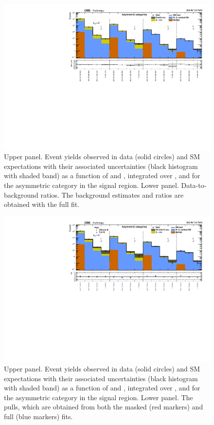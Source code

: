 \clearpage
\begin{figure}[h!]
  \centering
  \caption{Upper panel. Event yields observed in data (solid circles)
    and SM expectations with their associated uncertainties (black
    histogram with shaded band) as a function of \nb and \scalht,
    integrated over \mht, and for the asymmetric \njet category
    in the signal region. Lower panel. Data-to-background ratios. The
    background estimates and ratios are obtained with the full fit. }
  \label{fig:mr_asym_post}
  \includegraphics[width=1.\linewidth]{figures/results/36invfb_preapproval/asym/summaryPlot_Asymmetric_fit_b}
\end{figure}

\clearpage
\begin{figure}[h!]
  \centering
  \caption{Upper panel. Event yields observed in data (solid circles)
    and SM expectations with their associated uncertainties (black
    histogram with shaded band) as a function of \nb and \scalht,
    integrated over \mht, and for the asymmetric \njet category
    in the signal region. Lower panel. The pulls, which are obtained
    from both the masked (red markers) and full (blue markers) fits. }
  \label{fig:mr_asym_pulls}
  \includegraphics[width=1.\linewidth]{figures/results/36invfb_preapproval/asym/summaryPlot_Asymmetric_prefit_overlay_fit_b}
\end{figure}

